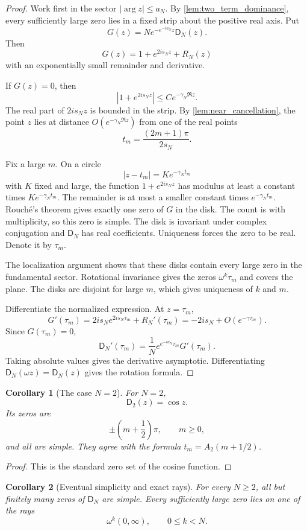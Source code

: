 \documentclass{aomart}
\newtheorem{corollary}[corollary]{Corollary}
\theoremstyle{definition}
\theoremstyle{remark}
\newcommand{\Dfun}{\mathsf D}
\begin{document}
\begin{proof}
Work first in the sector $|\arg z|\leq a_N$.  By \cref{lem:two_term_dominance}, every sufficiently large zero lies in a fixed strip about the positive real axis.  Put
\[
G(z)=N e^{-e^{-ia_N}z}\Dfun_N(z).
\]
Then
\[
G(z)=1+e^{2is_Nz}+R_N(z)
\]
with an exponentially small remainder and derivative.

If $G(z)=0$, then
\[
|1+e^{2is_Nz}|
\leq
C e^{-\gamma_N\Re z}.
\]
The real part of $2is_Nz$ is bounded in the strip.  By \cref{lem:near_cancellation}, the point $z$ lies at distance $O(e^{-\gamma_N\Re z})$ from one of the real points
\[
 t_m=\frac{(2m+1)\pi}{2s_N}.
\]

Fix a large $m$.  On a circle
\[
|z-t_m|=K e^{-\gamma_Nt_m}
\]
with $K$ fixed and large, the function $1+e^{2is_Nz}$ has modulus at least a constant times $K e^{-\gamma_Nt_m}$.  The remainder is at most a smaller constant times $e^{-\gamma_Nt_m}$.  Rouch\'e's theorem gives exactly one zero of $G$ in the disk.  The count is with multiplicity, so this zero is simple.  The disk is invariant under complex conjugation and $\Dfun_N$ has real coefficients.  Uniqueness forces the zero to be real.  Denote it by $\tau_m$.

The localization argument shows that these disks contain every large zero in the fundamental sector.  Rotational invariance gives the zeros $\omega^k\tau_m$ and covers the plane.  The disks are disjoint for large $m$, which gives uniqueness of $k$ and $m$.

Differentiate the normalized expression.  At $z=\tau_m$,
\[
G'(\tau_m)
=
2is_Ne^{2is_N\tau_m}+R_N'(\tau_m)
=
-2is_N+O(e^{-\gamma\tau_m}).
\]
Since $G(\tau_m)=0$,
\[
\Dfun_N'(\tau_m)
=
\frac1N e^{e^{-ia_N}\tau_m}G'(\tau_m).
\]
Taking absolute values gives the derivative asymptotic.  Differentiating $\Dfun_N(\omega z)=\Dfun_N(z)$ gives the rotation formula.
\end{proof}

\begin{corollary}[The case $N=2$]\label{cor:case_two_zeros}
For $N=2$,
\[
\Dfun_2(z)=\cos z.
\]
Its zeros are
\[
\pm\left(m+\frac12\right)\pi,
\qquad m\geq0,
\]
and all are simple.  They agree with the formula $t_m=A_2(m+1/2)$.
\end{corollary}

\begin{proof}
This is the standard zero set of the cosine function.
\end{proof}

\begin{corollary}[Eventual simplicity and exact rays]\label{cor:eventual_simplicity}
For every $N\geq2$, all but finitely many zeros of $\Dfun_N$ are simple.  Every sufficiently large zero lies on one of the rays
\[
\omega^k(0,\infty),
\qquad 0\leq k<N.
\]
\end{corollary}
\end{document}
